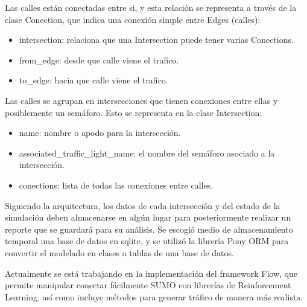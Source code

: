 Las calles están conectadas entre si, y esta relación se representa a
través de la clase Conection, que indica una conexión simple entre Edges
(calles):

\begin{itemize}
\item
  intersection: relaciona que una Intersection puede tener varias
  Conections.
\item
  from\_edge: desde que calle viene el trafico.
\item
  to\_edge: hacia que calle viene el trafico.
\end{itemize}

Las calles se agrupan en intersecciones que tienen conexiones entre
ellas y posiblemente un semáforo. Esto se representa en la clase
Intersection:

\begin{itemize}
\item
  name: nombre o apodo para la intersección.
\item
  associated\_traffic\_light\_name: el nombre del semáforo asociado a la
  intersección.
\item
  conections: lista de todas las conexiones entre calles.
\end{itemize}

Siguiendo la arquitectura, los datos de cada intersección y del estado
de la simulación deben almacenarse en algún lugar para posteriormente
realizar un reporte que se guardará para su análisis. Se escogió medio
de almacenamiento temporal una base de datos en sqlite, y se utilizó la
librería Pony ORM para convertir el modelado en clases a tablas de una
base de datos.

Actualmente se está trabajando en la implementación del framework Flow,
que permite manipular conectar fácilmente SUMO con librerías de
Reinforcement Learning, así como incluye métodos para generar tráfico de
manera más realista.

\clearpage %
